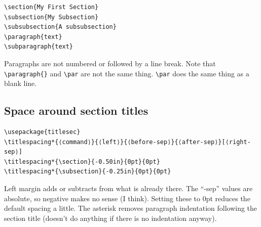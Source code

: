 \documentclass{article}
\begin{document}
\begin{minipage}[t]{0.5\textwidth}
\begin{lstlisting}
\section{My First Section}
\subsection{My Subsection}
\subsubsection{A subsubsection}
\paragraph{text}
\subparagraph{text}
\end{lstlisting}
\end{minipage}
\begin{minipage}[t]{0.5\textwidth}
Paragraphs are not numbered or followed by a line break.
Note that \verb|\paragraph{}| and \verb|\par| are not the same thing.
\verb|\par| does the same thing as a blank line.
\end{minipage}

\subsection{Space around section titles}
\begin{minipage}[t]{\textwidth}
\begin{verbatim}
\usepackage{titlesec}
\titlespacing*{⟨command⟩}{⟨left⟩}{⟨before-sep⟩}{⟨after-sep⟩}[⟨right-sep⟩]
\titlespacing*{\section}{-0.50in}{0pt}{0pt}
\titlespacing*{\subsection}{-0.25in}{0pt}{0pt}
\end{verbatim}
\end{minipage}
\begin{minipage}[t]{\textwidth}
    Left margin adds or subtracts from what is already there. The ``-sep'' values
    are absolute, so negative makes no sense (I think). Setting these to 0pt
    reduces the default spacing a little. The asterisk removes paragraph
    indentation following the section title (doesn't do anything if there
    is no indentation anyway).
\end{minipage}
\end{document}
